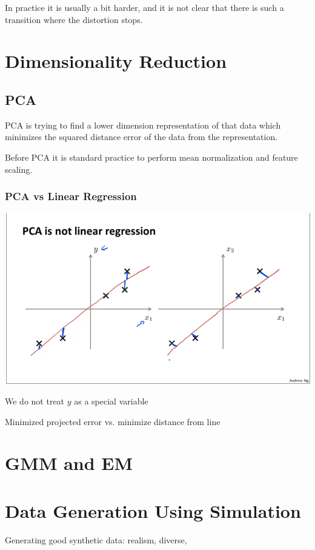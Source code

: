 In practice it is usually a bit harder, and it is not clear that there is such a transition where the distortion stops.

\section{Dimensionality Reduction}

\subsection{PCA}

PCA is trying to find a lower dimension representation of that data which minimizes the squared distance error of the data from the representation.

Before PCA it is standard practice to perform mean normalization and feature scaling. 

\subsubsection{PCA vs Linear Regression}

\includegraphics[width=0.9\columnwidth]{ml_figures/PCA_Linear.png}

We do not treat $y$ as a special variable

Minimized projected error vs. minimize distance from line

\section{GMM and EM}


\section{Data Generation Using Simulation}

Generating good synthetic data: 
realism, 
diverse,


